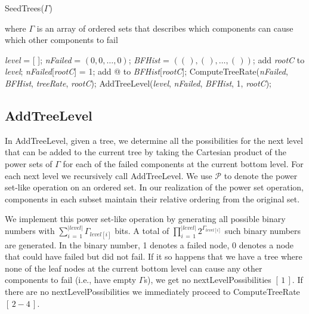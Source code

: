 \documentclass[12pt]{article}
\newcommand{\varName}[1]{\textrm{\it#1}}
\newcommand{\citeLine}[1]{$[\,#1\,]$}
\newcommand{\citeBlock}[2]{$[\,#1 - #2\,]$}
\begin{document}
\begin{algorithm}
\caption{SeedTrees($\Gamma$)}
\label{alg:Seedtrees}
where $\Gamma$ is an array of ordered sets that describes which components can cause which other components to fail \\
\begin{algorithmic}[1]
\FOR{\varName{rootC} $\in$ \varName{compSet}}
  \STATE \varName{level} = [ ]; 
  \STATE \varName{nFailed} = $(0, 0, \ldots, 0)$; 
  \STATE \varName{BFHist} = $ ((\,), (\,), \ldots, (\,)) $; 
  \STATE add \varName{rootC} to \varName{level};
  \STATE \varName{nFailed}[\varName{rootC}] = 1;
  \STATE add @ to \varName{BFHist}[\varName{rootC}]; 
  \IF{Empty($\Gamma_{\varName{rootC}}$)}
    \STATE ComputeTreeRate(\varName{nFailed}, \varName{BFHist}, \varName{treeRate}, \varName{rootC});
  \ELSE
    \STATE AddTreeLevel(\varName{level}, \varName{nFailed}, \varName{BFHist}, 1, \varName{rootC});
  \ENDIF
\ENDFOR
\end{algorithmic}
\end{algorithm}

\subsection{AddTreeLevel}

 In AddTreeLevel, given a tree, we determine all the possibilities for the next level that can be added to the current tree by taking the Cartesian product of the power sets of $\Gamma$ for each of the failed components at the current bottom level. For each next level we recursively call AddTreeLevel. We use $\mathcal{P}$ to denote the power set-like operation on an ordered set. In our realization of the power set operation, components in each subset maintain their relative ordering from the original set.

 We implement this power set-like operation by generating all possible binary numbers with $\sum\limits_{i\,=\,1}^{|level|}\Gamma_{level[i]}$ bits. A total of $\prod\limits_{i\,=\,1}^{|level|}2^{\Gamma_{level[i]}}$ such binary numbers are generated. In the binary number, 1 denotes a failed node, 0 denotes a node that could have failed but did not fail. If it so happens that we have a tree where none of the leaf nodes at the current bottom level can cause any other components to fail (i.e., have empty $\Gamma$s), we get no nextLevelPossibilities \citeLine{1}. If there are no nextLevelPossibilities we immediately proceed to ComputeTreeRate \citeBlock{2}{4}.
\end{document}
